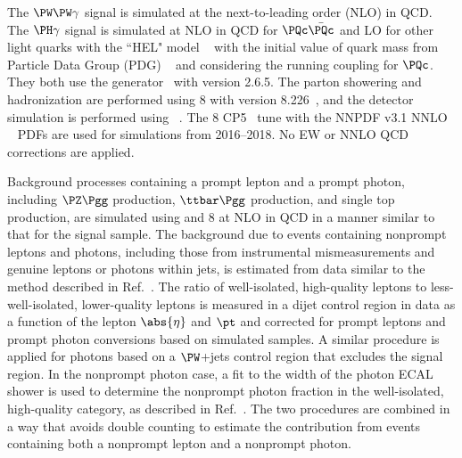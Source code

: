 The $\PW\PW\gamma$ signal is simulated at the next-to-leading order (NLO) in QCD. The $\PH\gamma$ signal is simulated at NLO in QCD for $\PQc\bar{\PQc}$ and LO for other light quarks with the ``HEL" model ~\cite{alloul2014phenomenology} with the initial value of quark mass from Particle Data Group (PDG) ~\cite{quarkmass} and considering the running coupling for $\PQc$. They both use the \MGvATNLO generator~\cite{MGatNLO} with version 2.6.5. The parton showering and hadronization are performed using {\PYTHIA}8 with version 8.226~\cite{Sjostrand:2014zea}, and the detector simulation is performed using \GEANTfour~\cite{AGOSTINELLI2003250}. The {\PYTHIA}8 CP5~\cite{Sirunyan:2019dfx} tune with the NNPDF v3.1 NNLO ~\cite{collaboration2017parton} PDFs are used for simulations from 2016--2018. No EW or NNLO QCD corrections are applied.

Background processes containing a prompt lepton and a prompt photon, including $\PZ\Pgg$ production, $\ttbar\Pgg$ production, and single top production, are simulated using \MGvATNLO and {\PYTHIA}8 at NLO in QCD in a manner similar to that for the signal sample. The background due to events containing nonprompt leptons and photons, including those from instrumental mismeasurements and genuine leptons or photons within jets, is estimated from data similar to the method described in Ref.~\cite{CMS:2021foa}. The ratio of well-isolated, high-quality leptons to less-well-isolated, lower-quality leptons is measured in a dijet control region in data as a function of the lepton $\abs{\eta}$ and $\pt$ and corrected for prompt leptons and prompt photon conversions based on simulated samples. A similar procedure is applied for photons based on a $\PW$+jets control region that excludes the signal region. In the nonprompt photon case, a fit to the width of the photon ECAL shower is used to determine the nonprompt photon fraction in the well-isolated, high-quality category, as described in Ref.~\cite{Sirunyan_2020}. The two procedures are combined in a way that avoids double counting to estimate the contribution from events containing both a nonprompt lepton and a nonprompt photon. 

